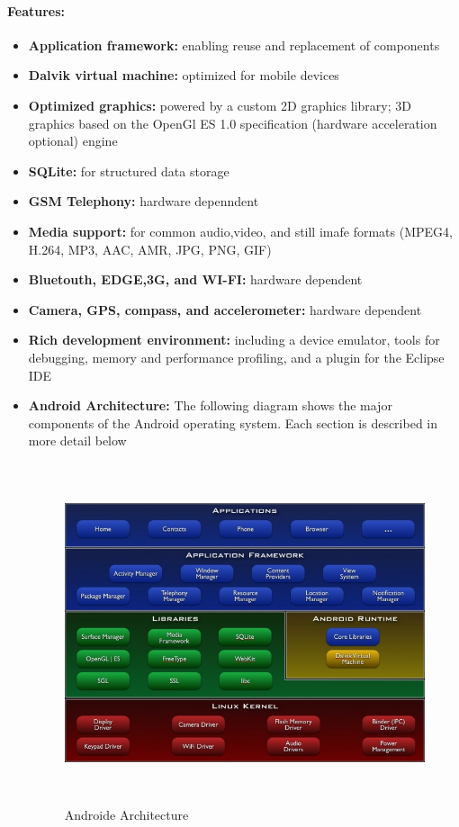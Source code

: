 \paragraph{Features:}
\begin{itemize}
 \item \textbf{Application framework: }enabling reuse and replacement of components
 \item \textbf{Dalvik virtual machine: }optimized for mobile devices
 \item \textbf{Optimized graphics: }powered by a custom 2D graphics library; 3D graphics based on the OpenGl ES 1.0 specification (hardware acceleration optional)
engine
\item \textbf{SQLite: }for structured data storage
\item \textbf{GSM Telephony: }hardware depenndent 
\item \textbf{Media support: }for common audio,video, and still imafe formats (MPEG4, H.264, MP3, AAC, AMR, JPG, PNG, GIF)
\item \textbf{Bluetouth, EDGE,3G, and WI-FI: }hardware dependent
\item \textbf{Camera, GPS, compass, and accelerometer: }hardware dependent
\item \textbf{Rich development environment: }including a device emulator, tools for debugging, memory and performance profiling, and a plugin for the Eclipse
IDE
\item \textbf{Android Architecture: }The following diagram shows the major components of the Android operating system. Each section is described in more detail below
\begin{figure}[!h]
 \center
 \includegraphics[width=12cm, height=10cm]{./images/mobile/arch}
 \caption{Androide Architecture}
\end{figure}
 

\end{itemize}
